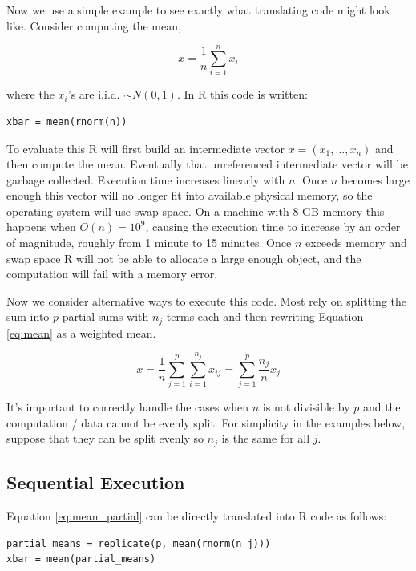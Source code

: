 \documentclass[12pt]{article}
\begin{document}
Now we use a simple example to see exactly what translating code might look
like.  Consider computing the mean,

\begin{equation}
    \bar{x} = \frac{1}{n} \sum_{i = 1}^n x_i
\label{eq:mean}
\end{equation}

where the $x_i$'s are
i.i.d. $\sim N(0, 1)$.  In R this code is written:

\begin{verbatim}
xbar = mean(rnorm(n))
\end{verbatim}

To evaluate this R will first build an intermediate vector $x = (x_1,
\dots, x_n)$ and then compute the mean. Eventually that unreferenced
intermediate vector will be garbage collected.
Execution time increases
linearly with $n$. Once $n$ becomes large
enough this vector will no longer fit into available physical memory, so
the operating system will use swap space. On a machine with 8 GB memory
this happens when $O(n) = 10^9$, causing the execution time
to increase by an order of magnitude, roughly from 1 minute to 15
minutes. Once $n$ exceeds memory and swap space R will not be able to allocate a
large enough object, and the computation will fail with a memory error.

Now we consider alternative ways to execute this code.  Most rely on
splitting the sum into $p$ partial sums with $n_j$ terms each and then rewriting
Equation \ref{eq:mean} as a weighted mean.

\begin{equation}
    \bar{x} = \frac{1}{n} \sum_{j = 1}^p \sum_{i = 1}^{n_j} x_{ij}
    = \sum_{j = 1}^p \frac{n_j}{n} \bar{x}_j
\label{eq:mean_partial}
\end{equation}

It's important to correctly handle the cases when $n$ is not divisible by $p$
and the computation / data cannot be evenly split. For simplicity in the
examples below, suppose that they can be split evenly so $n_j$ is the same
for all $j$.

\subsection{Sequential Execution}
\label{section:sequential}

Equation \ref{eq:mean_partial} can be directly translated into R code as
follows:

\begin{verbatim}
partial_means = replicate(p, mean(rnorm(n_j)))
xbar = mean(partial_means)
\end{verbatim}
\end{document}

